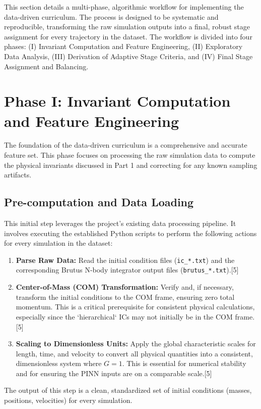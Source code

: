 \documentclass[11pt, letterpaper]{article}
\begin{document}
This section details a multi-phase, algorithmic workflow for implementing the data-driven curriculum. The process is designed to be systematic and reproducible, transforming the raw simulation outputs into a final, robust stage assignment for every trajectory in the dataset. The workflow is divided into four phases: (I) Invariant Computation and Feature Engineering, (II) Exploratory Data Analysis, (III) Derivation of Adaptive Stage Criteria, and (IV) Final Stage Assignment and Balancing.

\section{Phase I: Invariant Computation and Feature Engineering}

The foundation of the data-driven curriculum is a comprehensive and accurate feature set. This phase focuses on processing the raw simulation data to compute the physical invariants discussed in Part 1 and correcting for any known sampling artifacts.

\subsection{Pre-computation and Data Loading}

This initial step leverages the project's existing data processing pipeline. It involves executing the established Python scripts to perform the following actions for every simulation in the dataset:
\begin{enumerate}
    \item \textbf{Parse Raw Data:} Read the initial condition files (\texttt{ic\_*.txt}) and the corresponding Brutus N-body integrator output files (\texttt{brutus\_*.txt}).[5]
    \item \textbf{Center-of-Mass (COM) Transformation:} Verify and, if necessary, transform the initial conditions to the COM frame, ensuring zero total momentum. This is a critical prerequisite for consistent physical calculations, especially since the `hierarchical` ICs may not initially be in the COM frame.[5]
    \item \textbf{Scaling to Dimensionless Units:} Apply the global characteristic scales for length, time, and velocity to convert all physical quantities into a consistent, dimensionless system where $G=1$. This is essential for numerical stability and for ensuring the PINN inputs are on a comparable scale.[5]
\end{enumerate}
The output of this step is a clean, standardized set of initial conditions (masses, positions, velocities) for every simulation.
\end{document}

